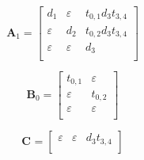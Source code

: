 \documentclass[11pt, a4paper, fleqn]{article}
\begin{document}
\begin{equation*}
\mathbf{A}_{1} = 
\left[\begin{array}{ ccc }
d_1	&\varepsilon	&t_{0,1}d_3t_{3,4}\\
\varepsilon	&d_2	&t_{0,2}d_3t_{3,4}\\
\varepsilon	&\varepsilon	&d_3\\
\end{array}\right]
\end{equation*}

\begin{equation*}
\mathbf{B}_{0} = 
\left[\begin{array}{ cc }
t_{0,1}	&\varepsilon\\
\varepsilon	&t_{0,2}\\
\varepsilon	&\varepsilon\\
\end{array}\right]
\end{equation*}

\begin{equation*}
\mathbf{C}_{{}} = 
\left[\begin{array}{ ccc }
\varepsilon	&\varepsilon	&d_3t_{3,4}\\
\end{array}\right]
\end{equation*}
\end{document}
